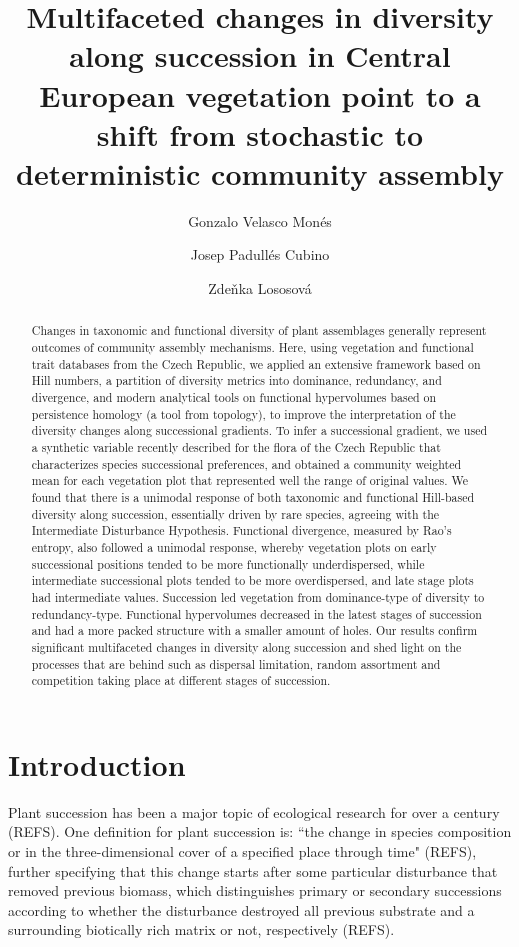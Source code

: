 \documentclass[a4paper, 9pt]{article}
\title{Multifaceted changes in diversity along succession in Central European vegetation point to a shift from stochastic to deterministic community assembly}
\author[1]{Gonzalo Velasco Monés}
\author[2,3]{Josep Padullés Cubino}
\author[1]{Zdeňka Lososová}
\affil[1]{
	Department of Botany \& Zoology, Faculy of Science, Masaryk University, Kotlářská 2, 611 37, Brno, Czech Republic}
\affil[2]{
	Autonomous University of Barcelona, 08193 Cerdanyola del Vallès, Spain}
\affil[3]{
	Centre de Recerca d’Ecologia i Aplicacions Forestals (CREAF), 08193 Cerdanyola del Vallès, Spain}
\newcommand{\refs}{(\alert{REFS})}
\begin{document}
	
	\maketitle
	
	\begin{abstract}
		Changes in taxonomic and functional diversity of plant assemblages generally represent outcomes of community assembly mechanisms. Here, using vegetation and functional trait databases from the Czech Republic, we applied an extensive framework based on Hill numbers, a partition of diversity metrics into dominance, redundancy, and divergence, and modern analytical tools on functional hypervolumes based on persistence homology (a tool from topology), to improve the interpretation of the diversity changes along successional gradients. To infer a successional gradient, we used a synthetic variable recently described for the flora of the Czech Republic that characterizes species successional preferences, and obtained a community weighted mean for each vegetation plot that represented well the range of original values. We found that there is a unimodal response of both taxonomic and functional Hill-based diversity along succession, essentially driven by rare species, agreeing with the Intermediate Disturbance Hypothesis. Functional divergence, measured by Rao’s entropy, also followed a unimodal response, whereby vegetation plots on early successional positions tended to be more functionally underdispersed, while intermediate successional plots tended to be more overdispersed, and late stage plots had intermediate values.  Succession led vegetation from dominance-type of diversity to redundancy-type. Functional hypervolumes decreased in the latest stages of succession and had a more packed structure with a smaller amount of holes. Our results confirm significant multifaceted changes in diversity along succession and shed light on the processes that are behind such as dispersal limitation, random assortment and competition taking place at different stages of succession.
	\end{abstract}
	
	
	\section*{Introduction}
	\label{sec:Intro}
	
	Plant succession has been a major topic of ecological research for over a century \refs. One definition for plant succession is: ``the change in species composition or in the three-dimensional cover of a specified place through time" \refs, further specifying that this change starts after some particular disturbance that removed previous biomass, which distinguishes primary or secondary successions according to whether the disturbance destroyed all previous substrate and a surrounding biotically rich matrix or not, respectively \refs. 
	
\end{document}
